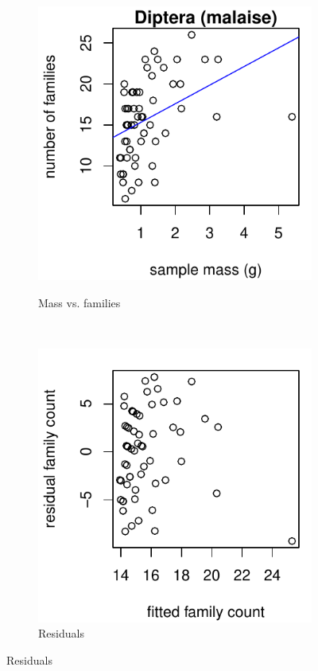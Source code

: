 \documentclass[10pt,letterpaper,twocolumn]{article}
\begin{document}
\begin{figure}[h]
	\centering
	\begin{subfigure}[b]{0.15\textwidth}
		\caption{Mass vs. families}
		\includegraphics[width=\textwidth]{plots/mass-vs-count/scatter/2015_malaise_Diptera_mass-vs-count.pdf}
		\label{fig:malaise_diptera_scatter}
	\end{subfigure}
	~
	\begin{subfigure}[b]{0.15\textwidth}
		\caption{Residuals}
		\includegraphics[width=\textwidth]{plots/mass-vs-count/residual/2015_malaise_Diptera_residual.pdf}

\end{subfigure}
\end{figure}
\end{document}
